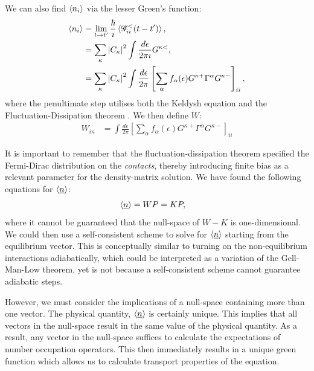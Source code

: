 \documentclass{article}
\begin{document}
\begin{multicols}{2}
        We can also find $\braket{n_i}$ via the lesser Green's function:
        \begin{align*}
            \braket{n_i} &= \lim_{t\rightarrow t'} \frac{\hbar}{\imath} \braket{\mathscr{G}^<_{ii}(t-t')}, \\
            &= \sum_\kappa \left|C_\kappa\right|^2 \int \frac{d\epsilon}{2 \pi \imath} G^{\kappa<}, \\
            &= \sum_\kappa \left|C_\kappa\right|^2 \int \frac{d\epsilon}{2 \pi} \left[ \sum_\alpha f_\alpha(\epsilon) G^{\kappa+} \Gamma^\alpha G^{\kappa-}\right]_{ii},
        \end{align*}
        where the penultimate step utilises both the Keldysh equation \cite{diventra} and the Fluctuation-Dissipation theorem \cite{haugjauho}. We then define $W$:
        \begin{align}
        \label{eq:wmatrix}
        W_{i\kappa} &= \int \frac{d\epsilon}{2 \pi} \left[ \sum_\alpha f_\alpha(\epsilon) G^{\kappa+} \Gamma^\alpha G^{\kappa-}\right]_{ii}
        \end{align}
         
        It is important to remember that the fluctuation-dissipation theorem specified the Fermi-Dirac distribution on the \emph{contacts}, thereby introducing finite bias as a relevant parameter for the density-matrix solution. We have found the following equations for $\braket{\underline{n}}$:
        \begin{align}
            \braket{\underline{n}} &= WP = KP\label{eq:selfconsistent},
        \end{align}
        where it cannot be guaranteed that the null-space of $W-K$ is one-dimensional. We could then use a self-consistent scheme to solve for $\braket{\underline{n}}$ starting from the equilibrium vector. This is conceptually similar to turning on the non-equilibrium interactions adiabatically, which could be interpreted as a variation of the Gell-Man-Low theorem\cite{gellmannlow, molinari}, yet is not because a self-consistent scheme cannot guarantee adiabatic steps.
        
        However, we must consider the implications of a null-space containing more than one vector. The physical quantity, $\braket{\underline{n}}$ is certainly unique. This implies that all vectors in the null-space result in the same value of the physical quantity. As a result, any vector in the null-space suffices to calculate the expectations of number occupation operators. This then immediately results in a unique green function which allows us to calculate transport properties of the equation.



\end{multicols}
\end{document}
